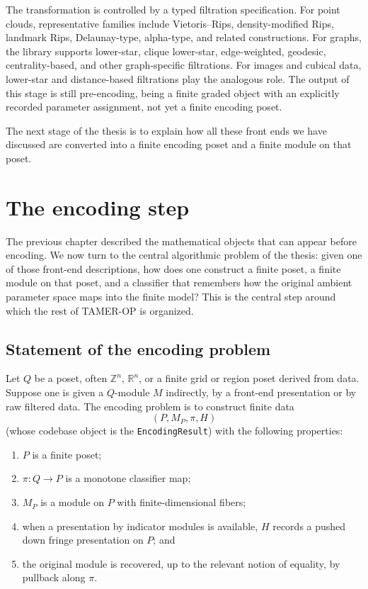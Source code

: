 \documentclass[11pt]{article}
\newcommand{\R}{\mathbb{R}}
\newcommand{\Z}{\mathbb{Z}}
\newcommand{\TAMER}{\textsc{TAMER-OP}}
\theoremstyle{definition}
\theoremstyle{remark}
\begin{document}
The transformation is controlled by a typed filtration specification.  For point clouds, representative families include Vietoris--Rips, density-modified Rips, landmark Rips, Delaunay-type, alpha-type, and related constructions.  For graphs, the library supports lower-star, clique lower-star, edge-weighted, geodesic, centrality-based, and other graph-specific filtrations.  For images and cubical data, lower-star and distance-based filtrations play the analogous role.  The output of this stage is still pre-encoding, being a finite graded object with an explicitly recorded parameter assignment, not yet a finite encoding poset.

The next stage of the thesis is to explain how all these front ends we have discussed are converted into a finite encoding poset and a finite module on that poset.


\section{The encoding step}\label{sec:encoding}

The previous chapter described the mathematical objects that can appear before encoding.  We now turn to the central algorithmic problem of the thesis: given one of those front-end descriptions, how does one construct a finite poset, a finite module on that poset, and a classifier that remembers how the original ambient parameter space maps into the finite model?  This is the central step around which the rest of \TAMER{} is organized.

\subsection{Statement of the encoding problem}

Let $Q$ be a poset, often $\Z^n$, $\R^n$, or a finite grid or region poset derived from data.  Suppose one is given a $Q$-module $M$ indirectly, by a front-end presentation or by raw filtered data.  The encoding problem is to construct finite data
\[
(P,M_P,\pi,H)
\]
(whose codebase object is the \texttt{EncodingResult}) with the following properties:
\begin{enumerate}[label=(\roman*)]
	\item $P$ is a finite poset;
	\item $\pi \colon Q \to P$ is a monotone classifier map;
	\item $M_P$ is a module on $P$ with finite-dimensional fibers;
	\item when a presentation by indicator modules is available, $H$ records a pushed down fringe presentation on $P$; and
	\item the original module is recovered, up to the relevant notion of equality, by pullback along $\pi$.
\end{enumerate}
\end{document}
